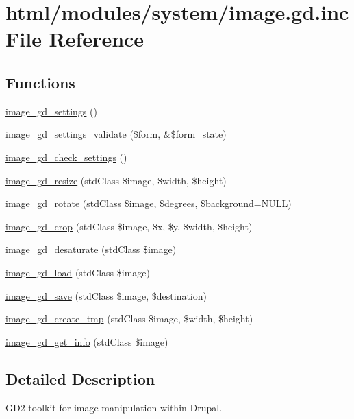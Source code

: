 \hypertarget{image_8gd_8inc}{
\section{html/modules/system/image.gd.inc File Reference}
\label{image_8gd_8inc}
}
\subsection*{Functions}
\begin{DoxyCompactItemize}
\item 
\hyperlink{group__image_ga2a492c31e41c59af2b7e976e28886b15}{image\_\-gd\_\-settings} ()
\item 
\hyperlink{group__image_gaab4f4ec4e8bc9abc51939a4194848fbb}{image\_\-gd\_\-settings\_\-validate} (\$form, \&\$form\_\-state)
\item 
\hyperlink{group__image_ga1926e8b1932480b81427c1301e8eb4dc}{image\_\-gd\_\-check\_\-settings} ()
\item 
\hyperlink{group__image_ga8d0c1abb541e01ec7a76a57add14a0b2}{image\_\-gd\_\-resize} (stdClass \$image, \$width, \$height)
\item 
\hyperlink{group__image_gadfe1dec9bcb15c4b223acc64f35631d2}{image\_\-gd\_\-rotate} (stdClass \$image, \$degrees, \$background=NULL)
\item 
\hyperlink{group__image_ga80d6e99f7b538e40dac6b917bfff1bb1}{image\_\-gd\_\-crop} (stdClass \$image, \$x, \$y, \$width, \$height)
\item 
\hyperlink{group__image_ga2cb8090035dbb1a1e6a9c82cb52c9789}{image\_\-gd\_\-desaturate} (stdClass \$image)
\item 
\hyperlink{group__image_gaa3b2912916ff9cfec8c7c8df8f3f1d75}{image\_\-gd\_\-load} (stdClass \$image)
\item 
\hyperlink{group__image_ga840179ad0e5ef2ea7619de19cab2d225}{image\_\-gd\_\-save} (stdClass \$image, \$destination)
\item 
\hyperlink{group__image_gabb63f813bf7d644843d7fc9024b6e1ea}{image\_\-gd\_\-create\_\-tmp} (stdClass \$image, \$width, \$height)
\item 
\hyperlink{group__image_gae5b31eb967a96b6b109dd5ddf720ab42}{image\_\-gd\_\-get\_\-info} (stdClass \$image)
\end{DoxyCompactItemize}


\subsection{Detailed Description}
GD2 toolkit for image manipulation within Drupal. 